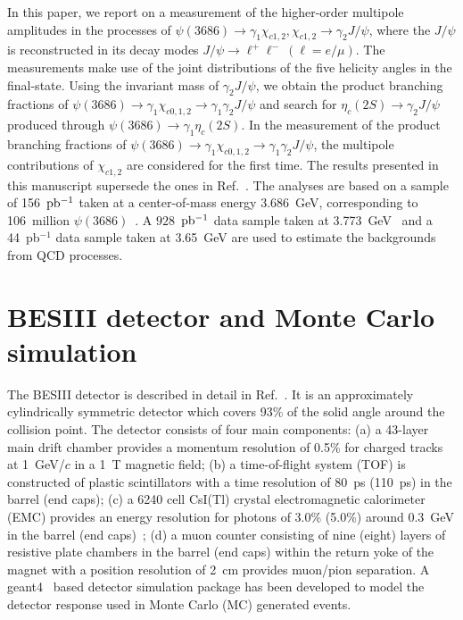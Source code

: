 \documentclass[prd,twocolumn,showpacs,amsmath,amssymb]{revtex4-1}
\begin{document}
In this paper, we report on a measurement of the higher-order multipole amplitudes in the processes of
$\psi(3686)\rightarrow \gamma_{1}\chi_{c1,2},\chi_{c1,2}\rightarrow\gamma_{2}J/\psi$, where the $J/\psi$ is reconstructed in its decay modes $J/\psi\rightarrow \ell^{+}\ell^{-}~(\ell=e/\mu)$.
The measurements make use of the joint distributions of the five helicity angles in the final-state. Using the invariant mass of $\gamma_{2}J/\psi$, we obtain the product branching fractions of
$\psi(3686)\rightarrow\gamma_{1}\chi_{c0,1,2}\to\gamma_1\gamma_2 J/\psi$ and search for $\eta_{c}(2S)\to\gamma_{2}J/\psi$ produced
through $\psi(3686)\rightarrow\gamma_{1}\eta_{c}(2S)$. In the measurement of the product branching fractions of $\psi(3686)\rightarrow\gamma_{1}\chi_{c0,1,2}\to\gamma_1\gamma_2 J/\psi$,
the multipole contributions of $\chi_{c1,2}$ are considered for the first time. The results presented in this manuscript supersede the ones in Ref.~\cite{BESIII_chicj}. The analyses are based on a sample of 156~$\rm pb^{-1}$
taken at a center-of-mass energy 3.686~GeV, corresponding to 106~million $\psi(3686)$~\cite{psip_N}.
A $928$~$\rm pb^{-1}$ data sample taken at 3.773~GeV~\cite{3773_N} and a 44~pb$^{-1}$ data sample taken at 3.65~GeV are used to estimate the backgrounds from QCD processes.


\section{BESIII detector and Monte Carlo simulation}

The BESIII detector is described in detail in Ref.~\cite{BESIII_detector}. It is an approximately cylindrically symmetric detector
which covers 93\% of the solid angle around the collision point. The detector consists of four main components: (a) a 43-layer main drift chamber provides a momentum resolution of 0.5\% for charged tracks at 1~GeV/$c$ in a 1~T magnetic field; (b) a time-of-flight system (TOF) is
constructed of plastic scintillators with a time resolution of 80~ps (110~ps) in the barrel (end caps); (c) a 6240 cell CsI(Tl) crystal electromagnetic
calorimeter (EMC) provides an energy resolution for photons of 3.0\% (5.0\%) around 0.3~GeV in the barrel (end caps)~\cite{photon_resolution};  (d) a muon counter consisting of
nine (eight) layers of resistive plate chambers in the barrel (end caps) within the return yoke of the magnet with a position resolution of 2~cm provides
muon/pion separation. A {\sc geant4}~\cite{GEANT4} based detector simulation package has been developed to model the detector response used in
Monte Carlo (MC) generated events.
\end{document}
